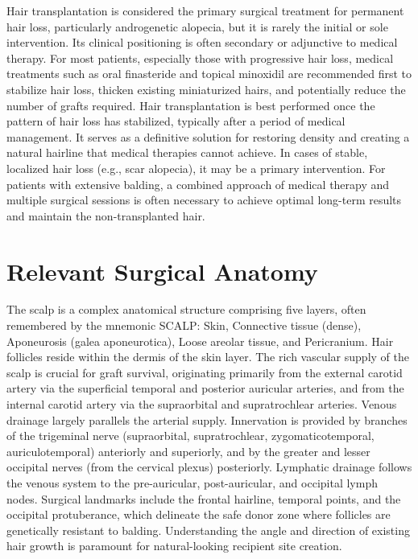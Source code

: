 Hair transplantation is considered the primary surgical treatment for permanent hair loss, particularly androgenetic alopecia, but it is rarely the initial or sole intervention. Its clinical positioning is often secondary or adjunctive to medical therapy. For most patients, especially those with progressive hair loss, medical treatments such as oral finasteride and topical minoxidil are recommended first to stabilize hair loss, thicken existing miniaturized hairs, and potentially reduce the number of grafts required. Hair transplantation is best performed once the pattern of hair loss has stabilized, typically after a period of medical management. It serves as a definitive solution for restoring density and creating a natural hairline that medical therapies cannot achieve. In cases of stable, localized hair loss (e.g., scar alopecia), it may be a primary intervention. For patients with extensive balding, a combined approach of medical therapy and multiple surgical sessions is often necessary to achieve optimal long-term results and maintain the non-transplanted hair.

\section*{Relevant Surgical Anatomy}
The scalp is a complex anatomical structure comprising five layers, often remembered by the mnemonic SCALP: Skin, Connective tissue (dense), Aponeurosis (galea aponeurotica), Loose areolar tissue, and Pericranium. Hair follicles reside within the dermis of the skin layer. The rich vascular supply of the scalp is crucial for graft survival, originating primarily from the external carotid artery via the superficial temporal and posterior auricular arteries, and from the internal carotid artery via the supraorbital and supratrochlear arteries. Venous drainage largely parallels the arterial supply. Innervation is provided by branches of the trigeminal nerve (supraorbital, supratrochlear, zygomaticotemporal, auriculotemporal) anteriorly and superiorly, and by the greater and lesser occipital nerves (from the cervical plexus) posteriorly. Lymphatic drainage follows the venous system to the pre-auricular, post-auricular, and occipital lymph nodes. Surgical landmarks include the frontal hairline, temporal points, and the occipital protuberance, which delineate the safe donor zone where follicles are genetically resistant to balding. Understanding the angle and direction of existing hair growth is paramount for natural-looking recipient site creation.

